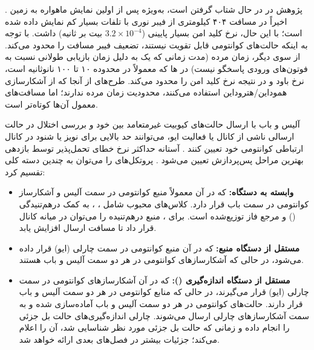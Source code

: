 پژوهش در  در حال شتاب گرفتن است، به‌ویژه پس از اولین نمایش  ماهواره به زمین \cite{1-36}. اخیراً  در مسافت ۴۰۴ کیلومتری از فیبر نوری با تلفات بسیار کم نمایش داده شده است؛ با این حال، نرخ کلید امن بسیار پایینی ($3.2 \times 10^{-4}$ بیت بر ثانیه) داشت. با توجه به اینکه حالت‌های کوانتومی قابل تقویت نیستند، تضعیف فیبر مسافت را محدود می‌کند. از سوی دیگر، زمان مرده (مدت زمانی که یک  به دلیل زمان بازیابی طولانی نسبت به فوتون‌های ورودی پاسخگو نیست) در ها که معمولاً در محدوده ۱۰ تا ۱۰۰ نانوثانیه است، نرخ باود و در نتیجه نرخ کلید امن را محدود می‌کند. طرح‌های  از آنجا که از آشکارسازی هموداین/هتروداین استفاده می‌کنند، محدودیت زمان مرده ندارند؛ اما مسافت‌های معمول آن‌ها کوتاه‌تر است.

آلیس و باب با ارسال حالت‌های کیوبیت غیرمتعامد بین خود و بررسی اختلال در حالت ارسالی ناشی از کانال یا فعالیت ایو، می‌توانند حد بالایی برای نویز یا شنود در کانال ارتباطی کوانتومی خود تعیین کنند \cite{1-9}. آستانه حداکثر نرخ خطای تحمل‌پذیر توسط بازدهی بهترین مراحل پس‌پردازش تعیین می‌شود \cite{1-9}. پروتکل‌های  را می‌توان به چندین دسته کلی تقسیم کرد:
\begin{itemize}
	\item \textbf{ وابسته به دستگاه:} که در آن معمولاً منبع کوانتومی در سمت آلیس و آشکارساز کوانتومی در سمت باب قرار دارد. کلاس‌های محبوب شامل ، ،  به کمک درهم‌تنیدگی () و مرجع فاز توزیع‌شده است. برای ، منبع درهم‌تنیده را می‌توان در میانه کانال قرار داد تا مسافت ارسال افزایش یابد.
	\item \textbf{ مستقل از دستگاه منبع:} که در آن منبع کوانتومی در سمت چارلی (ایو) قرار داده می‌شود، در حالی که آشکارسازهای کوانتومی در هر دو سمت آلیس و باب هستند.
	\item \textbf{ مستقل از دستگاه اندازه‌گیری ():} که در آن آشکارسازهای کوانتومی در سمت چارلی (ایو) قرار می‌گیرند، در حالی که منابع کوانتومی در هر دو سمت آلیس و باب قرار دارند. حالت‌های کوانتومی در هر دو سمت آلیس و باب آماده‌سازی شده و به سمت آشکارسازهای چارلی ارسال می‌شوند. چارلی اندازه‌گیری‌های حالت بل جزئی را انجام داده و زمانی که حالت بل جزئی مورد نظر شناسایی شد، آن را اعلام می‌کند؛ جزئیات بیشتر در فصل‌های بعدی ارائه خواهد شد.
\end{itemize}

